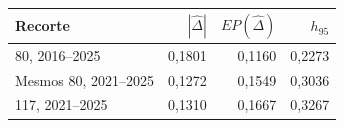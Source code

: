 \begin{tabular}{lrrr}
\toprule
Recorte & $|\widehat\Delta|$ & $EP(\widehat\Delta)$ & $h_{95}$\\
\midrule
80, 2016--2025 & 0,1801 & 0,1160 & 0,2273\\
Mesmos 80, 2021--2025 & 0,1272 & 0,1549 & 0,3036\\
117, 2021--2025 & 0,1310 & 0,1667 & 0,3267\\
\bottomrule
\end{tabular}
